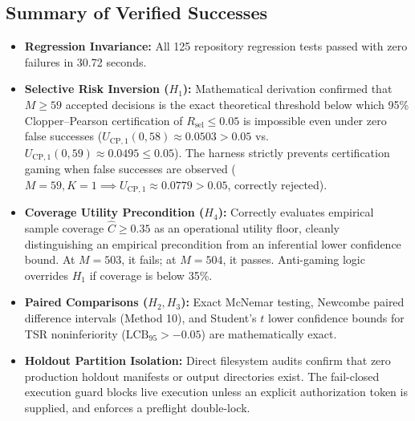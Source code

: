 \documentclass[10pt,a4paper]{article}
\begin{document}
\subsection{Summary of Verified Successes}
\begin{itemize}
    \item \textbf{Regression Invariance:} All 125 repository regression tests passed with zero failures in 30.72 seconds.
    \item \textbf{Selective Risk Inversion ($H_1$):} Mathematical derivation confirmed that $M \ge 59$ accepted decisions is the exact theoretical threshold below which 95\% Clopper--Pearson certification of $R_{\mathrm{sel}} \le 0.05$ is impossible even under zero false successes ($U_{\mathrm{CP}, 1}(0, 58) \approx 0.0503 > 0.05$ vs.\ $U_{\mathrm{CP}, 1}(0, 59) \approx 0.0495 \le 0.05$). The harness strictly prevents certification gaming when false successes are observed ($M = 59, K = 1 \implies U_{\mathrm{CP}, 1} \approx 0.0779 > 0.05$, correctly rejected).
    \item \textbf{Coverage Utility Precondition ($H_4$):} Correctly evaluates empirical sample coverage $\hat{C} \ge 0.35$ as an operational utility floor, cleanly distinguishing an empirical precondition from an inferential lower confidence bound. At $M = 503$, it fails; at $M = 504$, it passes. Anti-gaming logic overrides $H_1$ if coverage is below 35\%.
    \item \textbf{Paired Comparisons ($H_2, H_3$):} Exact McNemar testing, Newcombe paired difference intervals (Method 10), and Student's $t$ lower confidence bounds for TSR noninferiority ($\mathrm{LCB}_{95} > -0.05$) are mathematically exact.
    \item \textbf{Holdout Partition Isolation:} Direct filesystem audits confirm that zero production holdout manifests or output directories exist. The fail-closed execution guard blocks live execution unless an explicit authorization token is supplied, and enforces a preflight double-lock.
\end{itemize}
\end{document}
